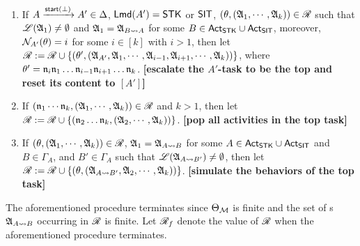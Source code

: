 {\begin{minipage}{0.9\textwidth}
\begin{enumerate}
    \item If $A \xrightarrow{{\mathsf{start} }(\bot)}A' \in\Delta$, ${\sf Lmd}(A')=\mathsf{STK}$ or ${\sf SIT}$, $(\theta, ({\mathfrak{A} }_1,\cdots,{\mathfrak{A} }_k)) \in \mathscr{R}$ such that ${\mathscr{L} }({\mathfrak{A} }_1) \neq \emptyset$ and ${\mathfrak{A} }_1 = {\mathfrak{A} }_{B\rightsquigarrow A}$ for some $B \in {\sf Act}_{\sf STK}\cup{\sf Act}_{\sf SIT}$, moreover, $\mathcal{N}_{A'}(\theta) = i$ for some $i \in [k]$ with $i > 1$, 
        then let $\mathscr{R}:= \mathscr{R} \cup \{(\theta', ({\mathfrak{A} }_{A'}, {\mathfrak{A} }_1, \cdots,{\mathfrak{A} }_{i-1},{\mathfrak{A} }_{i+1},\cdots,{\mathfrak{A} }_{k}))\}$, where $\theta' = \mathfrak{n}_i\mathfrak{n}_1\dots\mathfrak{n}_{i-1}\mathfrak{n}_{i+1}\dots\mathfrak{n}_k$. 
        \textbf{[escalate the $A'$-task to be the top and reset its content to $[A']$]}
    \item If $(\mathfrak{n}_1 \cdots \mathfrak{n}_k, ({\mathfrak{A} }_1,\cdots,{\mathfrak{A} }_k)) \in \mathscr{R}$ and $k>1$, then let $\mathscr{R} := \mathscr{R} \cup \{(\mathfrak{n}_2\dots\mathfrak{n}_k, ({\mathfrak{A} }_2,\cdots,{\mathfrak{A} }_k))\}$.
        \textbf{[pop all activities in the top task]}
%
    \item If $(\theta, ({\mathfrak{A} }_1,\cdots,{\mathfrak{A} }_k)) \in \mathscr{R}$, ${\mathfrak{A} }_1 = {\mathfrak{A} }_{A\rightsquigarrow B}$ for some $A\in{\sf Act}_{\mathsf{STK}}\cup{\sf Act}_{\mathsf{SIT}}$ and $B \in \Gamma_A$, and $B'  \in \Gamma_A$ such that ${\mathscr{L} }({\mathfrak{A} }_{A\rightsquigarrow B'}) \neq \emptyset$, then let 
    $\mathscr{R} := \mathscr{R} \cup \{(\theta, ({\mathfrak{A} }_{A\rightsquigarrow B'}, {\mathfrak{A} }_2,\cdots,{\mathfrak{A} }_k))\}$. 
        \textbf{[simulate the behaviors of the top task]}
\end{enumerate}
\end{minipage}
}

\medskip

The aforementioned procedure terminates since $\Theta_{\mathcal{M} }$ is finite and the set of {\NFA}s ${\mathfrak{A} }_{A\rightsquigarrow B}$ occurring in $\mathscr{R}$ is finite.
Let $\mathscr{R}_f$ denote the value of $\mathscr{R}$ when the aforementioned procedure terminates. 





